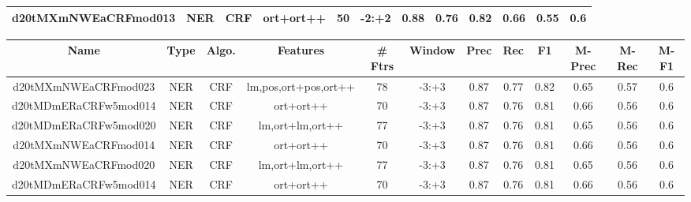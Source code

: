 \documentclass[a4paper]{article}
\begin{document}
\begin{landscape}
\begin{center}
\begin{tabular}{ |c|c|c|c|c|c|c|c|c|c|c|c|}
 	
 
 	
 		
 		\small{ d20tMXmNWEaCRFmod013 } & NER & CRF & ort+ort++  &  50 &  -2:+2  &  0.88 & 0.76 & 0.82  &  0.66 & 0.55 & 0.6 \\
 		
 \hline
\end{tabular}
\end{center}




\begin{center}
\begin{tabular}{ |c|c|c|c|c|c|c|c|c|c|c|c|} 
 \hline
 	Name & Type & Algo. & Features & \# Ftrs & Window & Prec & Rec & F1 & M-Prec & M-Rec & M-F1\\
 \hline

 		

 	
 
 	
 		
 		\small{ d20tMXmNWEaCRFmod023 } & NER & CRF & lm,pos,ort+pos,ort++  &  78 &  -3:+3  &  0.87 & 0.77 & 0.82  &  0.65 & 0.57 & 0.6 \\
 		

 	
 
 	
 		
 		\small{ d20tMDmERaCRFw5mod014 } & NER & CRF & ort+ort++  &  70 &  -3:+3  &  0.87 & 0.76 & 0.81  &  0.66 & 0.56 & 0.6 \\
 		

 	
 
 	
 		
 		\small{ d20tMDmERaCRFw5mod020 } & NER & CRF & lm,ort+lm,ort++  &  77 &  -3:+3  &  0.87 & 0.76 & 0.81  &  0.65 & 0.56 & 0.6 \\
 		

 	
 
 	
 		
 		\small{ d20tMXmNWEaCRFmod014 } & NER & CRF & ort+ort++  &  70 &  -3:+3  &  0.87 & 0.76 & 0.81  &  0.66 & 0.56 & 0.6 \\
 		

 	
 
 	
 		
 		\small{ d20tMXmNWEaCRFmod020 } & NER & CRF & lm,ort+lm,ort++  &  77 &  -3:+3  &  0.87 & 0.76 & 0.81  &  0.65 & 0.56 & 0.6 \\
 		

 	
 
 	
 		
 		\small{ d20tMDmERaCRFw5mod014 } & NER & CRF & ort+ort++  &  70 &  -3:+3  &  0.87 & 0.76 & 0.81  &  0.66 & 0.56 & 0.6 \\
 		


\end{tabular}
\end{center}
\end{landscape}
\end{document}

